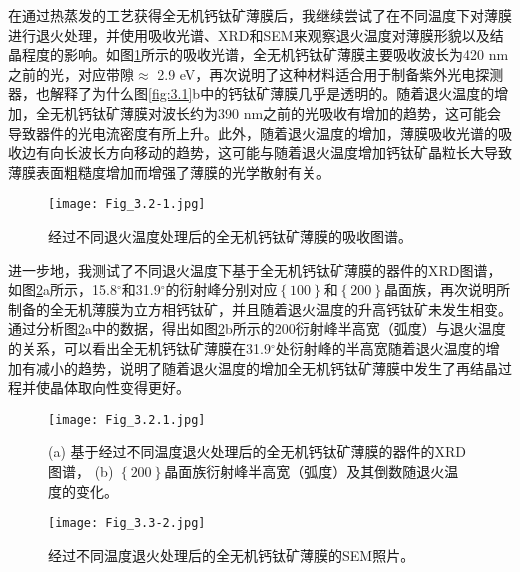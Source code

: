 \documentclass[forlib]{WHUMaster}   %
\def\degree{${}^{\circ}$} %
\begin{document}
{\iffalse 如\ref{fig:3.2} 所示，吸收图谱和XRD图谱综合表明得到了CsPbCl$_3$钙钛矿材料，退火可使薄膜结晶性变好。\fi
在通过热蒸发的工艺获得全无机钙钛矿薄膜后，我继续尝试了在不同温度下对薄膜进行退火处理，并使用吸收光谱、XRD和SEM来观察退火温度对薄膜形貌以及结晶程度的影响。如图\ref{fig:3.2}所示的吸收光谱，全无机钙钛矿薄膜主要吸收波长为420 nm之前的光，对应带隙$\approx$ 2.9 eV，再次说明了这种材料适合用于制备紫外光电探测器，也解释了为什么图\ref{fig:3.1}b中的钙钛矿薄膜几乎是透明的。随着退火温度的增加，全无机钙钛矿薄膜对波长约为390 nm之前的光吸收有增加的趋势，这可能会导致器件的光电流密度有所上升。此外，随着退火温度的增加，薄膜吸收光谱的吸收边有向长波长方向移动的趋势，这可能与随着退火温度增加钙钛矿晶粒长大导致薄膜表面粗糙度增加而增强了薄膜的光学散射有关\cite{RN91}。

\begin{figure}[htb]
\centering
  \texttt{[image: Fig\_3.2-1.jpg]}
  \caption{\rm 经过不同退火温度处理后的全无机钙钛矿薄膜的吸收图谱。}
  \label{fig:3.2}
\end{figure}

进一步地，我测试了不同退火温度下基于全无机钙钛矿薄膜的器件的XRD图谱，如图\ref{fig:3.2.1}a所示，15.8{\degree}和31.9{\degree}的衍射峰分别对应$\left\{\num{100}\right\}$和$\left\{\num{200}\right\}$晶面族，再次说明所制备的全无机薄膜为立方相钙钛矿，并且随着退火温度的升高钙钛矿未发生相变。通过分析图\ref{fig:3.2.1}a中的数据，得出如图\ref{fig:3.2.1}b所示的200衍射峰半高宽（弧度）与退火温度的关系，可以看出全无机钙钛矿薄膜在31.9{\degree}处衍射峰的半高宽随着退火温度的增加有减小的趋势，说明了随着退火温度的增加全无机钙钛矿薄膜中发生了再结晶过程并使晶体取向性变得更好\cite{RN106}。\iffalse cite{X-Ray Diffraction A Practical Approach} \fi

\begin{figure}[ht]
\centering
  \texttt{[image: Fig\_3.2.1.jpg]}
  \caption{\rm (a) 基于经过不同温度退火处理后的全无机钙钛矿薄膜的器件的XRD图谱， (b) $\left\{\num{200}\right\}$晶面族衍射峰半高宽（弧度）及其倒数随退火温度的变化。}
  \label{fig:3.2.1}
\end{figure}

\begin{figure}[htbp]
\centering
  \texttt{[image: Fig\_3.3-2.jpg]}
  \caption{\rm 经过不同温度退火处理后的全无机钙钛矿薄膜的SEM照片。}
  \label{fig:3.3}
\end{figure}

}
\end{document}
